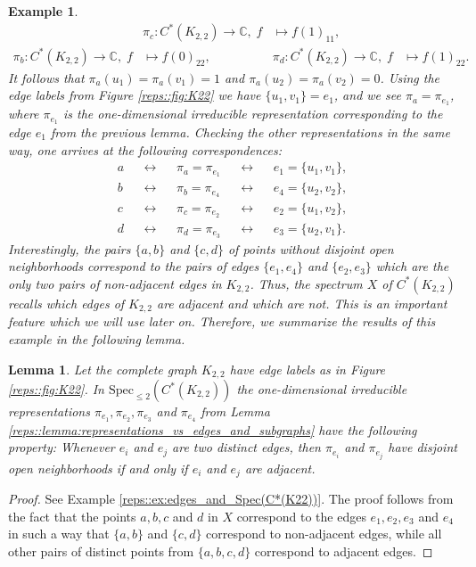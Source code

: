 \documentclass[a4paper]{amsart}
\newtheorem{lemma}[thm]{Lemma}
\newtheorem{example}[thm]{Example}
\newcommand{\C}{\mathbb{C}}
\begin{document}
\begin{example}
\begin{align*}
        &\pi_c: C^\ast(K_{2,2}) \to \C, \; f &\mapsto f(1)_{11}, \\
        \pi_b: C^\ast(K_{2,2}) \to \C, \; f &\mapsto f(0)_{22},
        &\pi_d: C^\ast(K_{2,2}) \to \C, \; f &\mapsto f(1)_{22}.
    \end{align*}
    It follows that $\pi_a(u_1) = \pi_a(v_1) = 1$ and $\pi_a(u_2) = \pi_a(v_2) = 0$. Using the edge labels from Figure \ref{reps::fig:K22} we have $\{u_1, v_1\} = e_1$, and we see $\pi_a = \pi_{e_1}$, where $\pi_{e_1}$ is the one-dimensional irreducible representation corresponding to the edge $e_1$ from the previous lemma. Checking the other representations in the same way, one arrives at the following correspondences:
    \begin{align*}
        a & &\leftrightarrow & &\pi_a = \pi_{e_1} & &\leftrightarrow& & e_1 = \{u_1, v_1\}, \\
        b & &\leftrightarrow & &\pi_b = \pi_{e_4} & &\leftrightarrow& & e_4 = \{u_2, v_2\}, \\
        c & &\leftrightarrow & &\pi_c = \pi_{e_2} & &\leftrightarrow& & e_2 = \{u_1, v_2\}, \\
        d & &\leftrightarrow & &\pi_d = \pi_{e_3} & &\leftrightarrow& & e_3 = \{u_2, v_1\}.
    \end{align*}
    Interestingly, the pairs $\{a,b\}$ and $\{c,d\}$ of points without disjoint open neighborhoods correspond to the pairs of edges $\{e_1, e_4\}$ and $\{e_2, e_3\}$ which are the only two pairs of non-adjacent edges in $K_{2,2}$. Thus, the spectrum $X$ of $C^\ast(K_{2,2})$ recalls which edges of $K_{2,2}$ are adjacent and which are not. This is an important feature which we will use later on. Therefore, we summarize the results of this example in the following lemma.
\end{example}

\begin{lemma}
    \label{reps::lemma:adjacency_of_K22edges_and_Spec(C*(K22))}
    Let the complete graph $K_{2,2}$ have edge labels as in Figure \ref{reps::fig:K22}. In $\mathrm{Spec}_{\leq 2}(C^\ast(K_{2,2}))$ the one-dimensional irreducible representations $\pi_{e_1}, \pi_{e_2}, \pi_{e_3}$ and $\pi_{e_4}$ from Lemma \ref{reps::lemma:representations_vs_edges_and_subgraphs} have the following property: Whenever $e_i$ and $e_j$ are two distinct edges, then $\pi_{e_i}$ and $\pi_{e_j}$ have disjoint open neighborhoods if and only if $e_i$ and $e_j$ are adjacent.
\end{lemma}

\begin{proof}
    See Example \ref{reps::ex:edges_and_Spec(C*(K22))}. The proof follows from the fact that the points $a, b, c$ and $d$ in $X$ correspond to the edges $e_1, e_2, e_3$ and $e_4$ in such a way that $\{a,b\}$ and $\{c,d\}$ correspond to non-adjacent edges, while all other pairs of distinct points from $\{a, b, c, d\}$ correspond to adjacent edges.
\end{proof}
\end{document}
